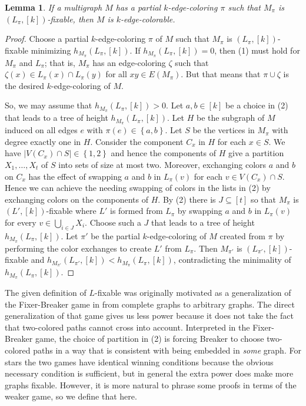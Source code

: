 \documentclass[12pt]{article}
\theoremstyle{plain}
\newtheorem{lem}[thm]{Lemma}
\theoremstyle{definition}
\theoremstyle{remark}
\newcommand{\set}[1]{\left\{ #1 \right\}}
\newcommand{\card}[1]{\left|#1\right|}
\newcommand{\irange}[1]{\left[#1\right]}
\newcommand{\parens}[1]{\left( #1 \right)}
\begin{document}
\begin{lem}\label{FixableCompletesColoring}
If a multigraph $M$ has a partial $k$-edge-coloring $\pi$ such that $M_\pi$ is $(L_\pi, \irange{k})$-fixable, then $M$ is $k$-edge-colorable.
\end{lem}
\begin{proof}
Choose a partial $k$-edge-coloring $\pi$ of $M$ such that $M_\pi$ is $(L_\pi, \irange{k})$-fixable minimizing $h_{M_\pi}\parens{L_\pi, \irange{k}}$. If $h_{M_\pi}\parens{L_\pi, \irange{k}} = 0$, then (1) must hold for $M_\pi$ and $L_\pi$; that is, $M_\pi$ has an edge-coloring $\zeta$ such that $\zeta(x) \in L_\pi(x) \cap L_\pi(y)$ for all $xy \in E(M_\pi)$.  But that means that $\pi \cup \zeta$ is the desired $k$-edge-coloring of $M$.  

So, we may assume that $h_{M_\pi}\parens{L_\pi, \irange{k}} > 0$.  Let $a,b \in \irange{k}$ be a choice in (2) that leads to a tree of height $h_{M_\pi}\parens{L_\pi, \irange{k}}$.  Let $H$ be the subgraph of $M$ induced on all edges $e$ with $\pi(e) \in \set{a,b}$.  Let $S$ be the vertices in $M_\pi$ with degree exactly one in $H$.  Consider the component $C_x$ in $H$ for each $x \in S$.  We have $\card{V(C_x) \cap S} \in \set{1,2}$ and hence the components of $H$ give a partition $X_1, \ldots, X_t$ of $S$ into sets of size at most two.  Moreover, exchanging colors $a$ and $b$ on $C_x$ has the effect of swapping $a$ and $b$ in $L_\pi(v)$ for each $v \in V(C_x) \cap S$.  Hence we can achieve the needing swapping of colors in the lists in (2) by exchanging colors on the components of $H$.  By (2) there is $J \subseteq \irange{t}$ so that $M_\pi$ is $(L', \irange{k})$-fixable where $L'$ is formed from $L_\pi$ by swapping $a$ and $b$ in $L_\pi(v)$ for every $v \in \bigcup_{i \in J} X_i$.  Choose such a $J$ that leads to a tree of height $h_{M_\pi}\parens{L_\pi, \irange{k}}$.  Let $\pi'$ be the partial $k$-edge-coloring of $M$ created from $\pi$ by performing the color exchanges to create $L'$ from $L_\pi$.  Then $M_{\pi'}$ is $(L_{\pi'}, \irange{k})$-fixable and $h_{M_{\pi'}}\parens{L_{\pi'}, \irange{k}} < h_{M_\pi}\parens{L_\pi, \irange{k}}$, contradicting the minimality of $h_{M_\pi}\parens{L_\pi, \irange{k}}$.
\end{proof}

The given definition of $L$-fixable was originally motivated as a generalization of the Fixer-Breaker game in \cite{HallGame} from complete graphs to arbitrary graphs.  
The direct generalization of that game gives us less power because it does not take the fact that two-colored paths cannot cross into account.  Interpreted in the Fixer-Breaker game, the choice of partition
in (2) is forcing Breaker to choose two-colored paths in a way that is consistent with being embedded in \emph{some} graph.  For stars the two games have identical winning conditions because the obvious necessary condition is sufficient, but in general the extra power does make more graphs fixable.  However, it is more natural to phrase some proofs in terms of the weaker game, so we define that here.
\end{document}
